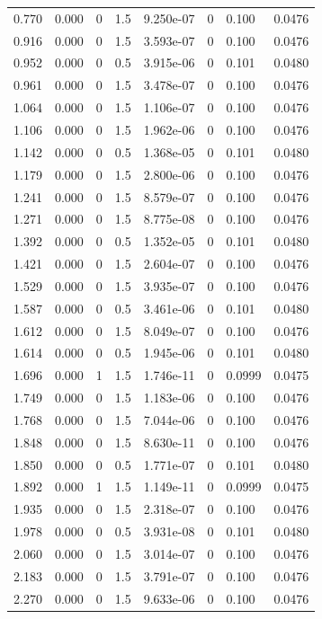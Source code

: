 \documentclass[preview]{standalone}
\begin{document}
{{\begin{tabular}{L{1.2cm}C{1.2cm} C{0.3cm}C{0.5cm} C{1.4cm}C{1.4cm} C{1.4cm}C{1.4cm}}
  0.770  &  0.000  & 0     & 1.5 &  9.250e-07  & 0  & 0.100 &  0.0476   \\ 
  0.916  &  0.000  & 0     & 1.5 &  3.593e-07  & 0  & 0.100 &  0.0476   \\ 
  0.952  &  0.000  & 0     & 0.5 &  3.915e-06  & 0  & 0.101 &  0.0480   \\ 
  0.961  &  0.000  & 0     & 1.5 &  3.478e-07  & 0  & 0.100 &  0.0476   \\ 
  1.064  &  0.000  & 0     & 1.5 &  1.106e-07  & 0  & 0.100 &  0.0476   \\ 
  1.106  &  0.000  & 0     & 1.5 &  1.962e-06  & 0  & 0.100 &  0.0476   \\ 
  1.142  &  0.000  & 0     & 0.5 &  1.368e-05  & 0  & 0.101 &  0.0480   \\ 
  1.179  &  0.000  & 0     & 1.5 &  2.800e-06  & 0  & 0.100 &  0.0476   \\ 
  1.241  &  0.000  & 0     & 1.5 &  8.579e-07  & 0  & 0.100 &  0.0476   \\ 
  1.271  &  0.000  & 0     & 1.5 &  8.775e-08  & 0  & 0.100 &  0.0476   \\ 
  1.392  &  0.000  & 0     & 0.5 &  1.352e-05  & 0  & 0.101 &  0.0480   \\ 
  1.421  &  0.000  & 0     & 1.5 &  2.604e-07  & 0  & 0.100 &  0.0476   \\ 
  1.529  &  0.000  & 0     & 1.5 &  3.935e-07  & 0  & 0.100 &  0.0476   \\ 
  1.587  &  0.000  & 0     & 0.5 &  3.461e-06  & 0  & 0.101 &  0.0480   \\ 
  1.612  &  0.000  & 0     & 1.5 &  8.049e-07  & 0  & 0.100 &  0.0476   \\ 
  1.614  &  0.000  & 0     & 0.5 &  1.945e-06  & 0  & 0.101 &  0.0480   \\ 
  1.696  &  0.000  & 1     & 1.5 &  1.746e-11  & 0  & 0.0999 &  0.0475   \\ 
  1.749  &  0.000  & 0     & 1.5 &  1.183e-06  & 0  & 0.100 &  0.0476   \\ 
  1.768  &  0.000  & 0     & 1.5 &  7.044e-06  & 0  & 0.100 &  0.0476   \\ 
  1.848  &  0.000  & 0     & 1.5 &  8.630e-11  & 0  & 0.100 &  0.0476   \\ 
  1.850  &  0.000  & 0     & 0.5 &  1.771e-07  & 0  & 0.101 &  0.0480   \\ 
  1.892  &  0.000  & 1     & 1.5 &  1.149e-11  & 0  & 0.0999 &  0.0475   \\ 
  1.935  &  0.000  & 0     & 1.5 &  2.318e-07  & 0  & 0.100 &  0.0476   \\ 
  1.978  &  0.000  & 0     & 0.5 &  3.931e-08  & 0  & 0.101 &  0.0480   \\ 
  2.060  &  0.000  & 0     & 1.5 &  3.014e-07  & 0  & 0.100 &  0.0476   \\ 
  2.183  &  0.000  & 0     & 1.5 &  3.791e-07  & 0  & 0.100 &  0.0476   \\ 
  2.270  &  0.000  & 0     & 1.5 &  9.633e-06  & 0  & 0.100 &  0.0476   \\ 
\hline 
\end{tabular} 

}}
\end{document}
